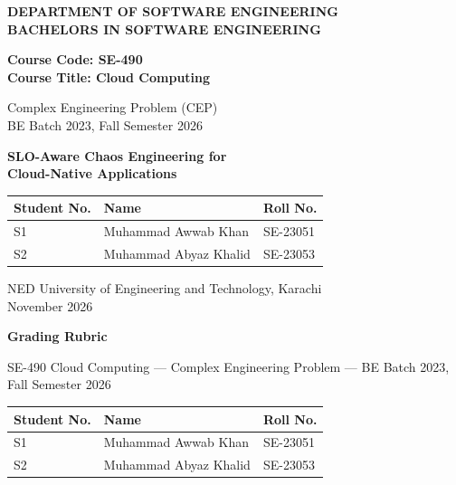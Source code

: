 \documentclass[11pt,a4paper]{article}
\begin{document}
\begin{center}
{\fontsize{14pt}{17pt}\selectfont\bfseries DEPARTMENT OF SOFTWARE ENGINEERING\\[2pt]
BACHELORS IN SOFTWARE ENGINEERING\par}
\vspace{2.5cm}
{\fontsize{14pt}{17pt}\selectfont\bfseries Course Code: SE-490\\[2pt] Course Title: Cloud Computing\par}
\vspace{6pt}
{\fontsize{12pt}{15pt}\selectfont Complex Engineering Problem (CEP)\\ BE Batch 2023, Fall Semester 2026\par}
\vspace{2.5cm}
{\fontsize{14pt}{17pt}\selectfont\bfseries SLO-Aware Chaos Engineering for\\ Cloud-Native Applications\par}
\vspace{2.5cm}
\begin{tabular}{|l|l|l|}
\hline
\textbf{Student No.} & \textbf{Name} & \textbf{Roll No.} \\ \hline
S1 & Muhammad Awwab Khan & SE-23051 \\ \hline
S2 & Muhammad Abyaz Khalid & SE-23053 \\ \hline
\end{tabular}
\vfill
NED University of Engineering and Technology, Karachi\\
November 2026
\end{center}

\newpage
\begin{center}
{\fontsize{14pt}{17pt}\selectfont\bfseries Grading Rubric\par}
\vspace{4pt}
SE-490 Cloud Computing --- Complex Engineering Problem --- BE Batch 2023, Fall Semester 2026
\end{center}

\noindent\begin{tabular}{|l|p{7cm}|l|}
\hline
\textbf{Student No.} & \textbf{Name} & \textbf{Roll No.} \\ \hline
S1 & Muhammad Awwab Khan & SE-23051 \\ \hline
S2 & Muhammad Abyaz Khalid & SE-23053 \\ \hline
\end{tabular}
\end{document}
